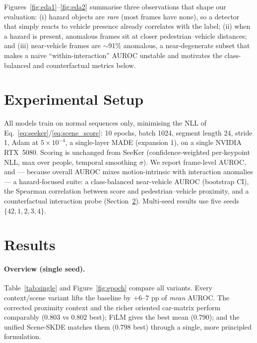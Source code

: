 \documentclass{article}
\begin{document}
Figures~\ref{fig:eda1}--\ref{fig:eda2} summarise three observations that shape our
evaluation: (i) hazard objects are \emph{rare} (most frames have none), so a
detector that simply reacts to vehicle presence already correlates with the
label; (ii) when a hazard is present, anomalous frames sit at closer
pedestrian--vehicle distances; and (iii) near-vehicle frames are $\sim$91\%
anomalous, a near-degenerate subset that makes a naive ``within-interaction''
AUROC unstable and motivates the class-balanced and counterfactual metrics below.

\section{Experimental Setup}
\label{sec:setup}
All models train on normal sequences only, minimising the NLL of
Eq.~\ref{eq:seeker}/\ref{eq:scene_score}: 10 epochs, batch 1024, segment length
24, stride 1, Adam at $5{\times}10^{-4}$, a single-layer MADE (expansion 1), on a
single NVIDIA RTX~5080. Scoring is unchanged from SeeKer (confidence-weighted
per-keypoint NLL, max over people, temporal smoothing $\sigma$). We report
frame-level AUROC, and --- because overall AUROC mixes motion-intrinsic with
interaction anomalies --- a hazard-focused suite: a class-balanced
near-vehicle AUROC (bootstrap CI), the Spearman correlation between score and
pedestrian--vehicle proximity, and a counterfactual interaction probe
(Section~\ref{sec:results}). Multi-seed results use five seeds
$\{42,1,2,3,4\}$.

\section{Results}
\label{sec:results}

\paragraph{Overview (single seed).} Table~\ref{tab:single} and
Figure~\ref{fig:epoch} compare all variants. Every context/scene variant lifts
the baseline by $+6$--$7$ pp of \emph{mean} AUROC. The corrected proximity
context and the richer oriented car-matrix perform comparably ($0.803$ vs
$0.802$ best); FiLM gives the best mean ($0.790$); and the unified Scene-SKDE
matches them ($0.798$ best) through a single, more principled formulation.
\end{document}
